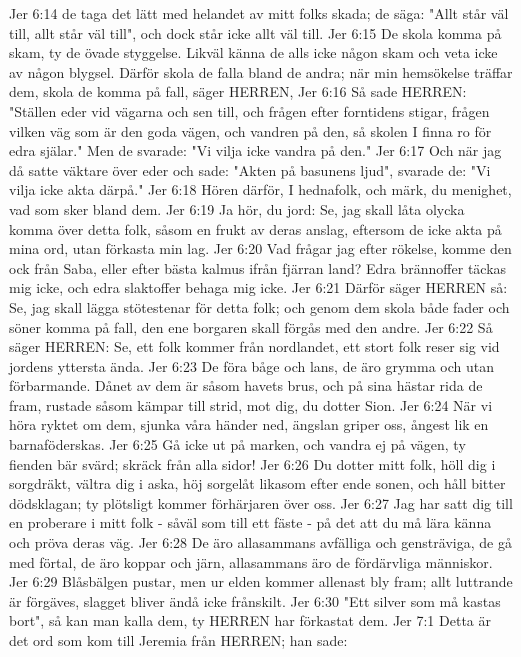 Jer 6:14  de taga det lätt med helandet av mitt folks skada; de säga: "Allt står väl till, allt står väl till", och dock står icke allt väl till.
Jer 6:15  De skola komma på skam, ty de övade styggelse. Likväl känna de alls icke någon skam och veta icke av någon blygsel. Därför skola de falla bland de andra; när min hemsökelse träffar dem, skola de komma på fall, säger HERREN,
Jer 6:16  Så sade HERREN: "Ställen eder vid vägarna och sen till, och frågen efter forntidens stigar, frågen vilken väg som är den goda vägen, och vandren på den, så skolen I finna ro för edra själar." Men de svarade: "Vi vilja icke vandra på den."
Jer 6:17  Och när jag då satte väktare över eder och sade: "Akten på basunens ljud", svarade de: "Vi vilja icke akta därpå."
Jer 6:18  Hören därför, I hednafolk, och märk, du menighet, vad som sker bland dem.
Jer 6:19  Ja hör, du jord: Se, jag skall låta olycka komma över detta folk, såsom en frukt av deras anslag, eftersom de icke akta på mina ord, utan förkasta min lag.
Jer 6:20  Vad frågar jag efter rökelse, komme den ock från Saba, eller efter bästa kalmus ifrån fjärran land? Edra brännoffer täckas mig icke, och edra slaktoffer behaga mig icke.
Jer 6:21  Därför säger HERREN så: Se, jag skall lägga stötestenar för detta folk; och genom dem skola både fader och söner komma på fall, den ene borgaren skall förgås med den andre.
Jer 6:22  Så säger HERREN: Se, ett folk kommer från nordlandet, ett stort folk reser sig vid jordens yttersta ända.
Jer 6:23  De föra båge och lans, de äro grymma och utan förbarmande. Dånet av dem är såsom havets brus, och på sina hästar rida de fram, rustade såsom kämpar till strid, mot dig, du dotter Sion.
Jer 6:24  När vi höra ryktet om dem, sjunka våra händer ned, ängslan griper oss, ångest lik en barnaföderskas.
Jer 6:25  Gå icke ut på marken, och vandra ej på vägen, ty fienden bär svärd; skräck från alla sidor!
Jer 6:26  Du dotter mitt folk, höll dig i sorgdräkt, vältra dig i aska, höj sorgelåt likasom efter ende sonen, och håll bitter dödsklagan; ty plötsligt kommer förhärjaren över oss.
Jer 6:27  Jag har satt dig till en proberare i mitt folk - såväl som till ett fäste - på det att du må lära känna och pröva deras väg.
Jer 6:28  De äro allasammans avfälliga och gensträviga, de gå med förtal, de äro koppar och järn, allasammans äro de fördärvliga människor.
Jer 6:29  Blåsbälgen pustar, men ur elden kommer allenast bly fram; allt luttrande är förgäves, slagget bliver ändå icke frånskilt.
Jer 6:30  "Ett silver som må kastas bort", så kan man kalla dem, ty HERREN har förkastat dem.
Jer 7:1  Detta är det ord som kom till Jeremia från HERREN; han sade:
